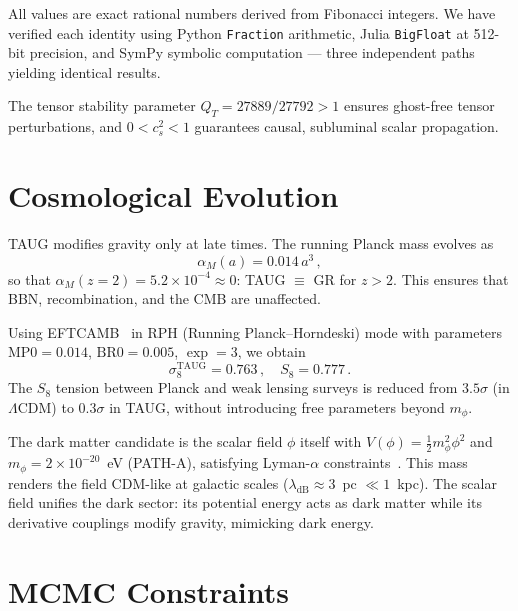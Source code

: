 \documentclass[twocolumn,showpacs,preprintnumbers,amsmath,amssymb,prd]{revtex4-2}
\begin{document}
All values are exact rational numbers derived from Fibonacci integers. We have verified each identity using Python \texttt{Fraction} arithmetic, Julia \texttt{BigFloat} at 512-bit precision, and SymPy symbolic computation --- three independent paths yielding identical results.

The tensor stability parameter $Q_T = 27889/27792 > 1$ ensures ghost-free tensor perturbations, and $0 < c_s^2 < 1$ guarantees causal, subluminal scalar propagation.

\section{Cosmological Evolution}
\label{sec:evolution}

TAUG modifies gravity only at late times. The running Planck mass evolves as
\begin{equation}
\alpha_M(a) = 0.014\,a^3\,,
\end{equation}
so that $\alpha_M(z=2) = 5.2 \times 10^{-4} \approx 0$: TAUG $\equiv$ GR for $z > 2$. This ensures that BBN, recombination, and the CMB are unaffected.

Using EFTCAMB~\cite{Hu2014} in RPH (Running Planck--Horndeski) mode with parameters $\text{MP0} = 0.014$, $\text{BR0} = 0.005$, $\exp = 3$, we obtain
\begin{equation}
\sigma_8^\text{TAUG} = 0.763\,,\quad S_8 = 0.777\,.
\end{equation}
The $S_8$ tension between Planck and weak lensing surveys is reduced from $3.5\sigma$ (in $\Lambda$CDM) to $0.3\sigma$ in TAUG, without introducing free parameters beyond $m_\phi$.

The dark matter candidate is the scalar field $\phi$ itself with $V(\phi) = \frac{1}{2}m_\phi^2\phi^2$ and $m_\phi = 2 \times 10^{-20}$~eV (PATH-A), satisfying Lyman-$\alpha$ constraints~\cite{Rogers2021}. This mass renders the field CDM-like at galactic scales ($\lambda_\text{dB} \approx 3$~pc $\ll 1$~kpc). The scalar field unifies the dark sector: its potential energy acts as dark matter while its derivative couplings modify gravity, mimicking dark energy.

\section{MCMC Constraints}
\label{sec:mcmc}
\end{document}
